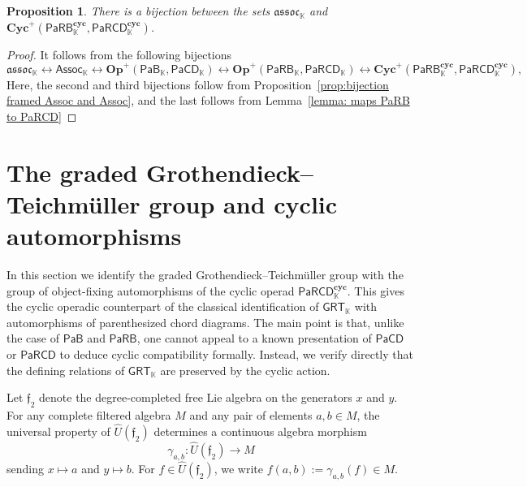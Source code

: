 \documentclass{amsart}
\newcommand{\kk}{\mathbb{K}}    %
\newcommand{\PaRB}{\mathsf{PaRB}}
\newcommand{\PaRCD}{\mathsf{PaRCD}}
\newcommand{\PaCD}{\mathsf{PaCD}}
\newcommand{\hPaB}{{\PaB}_{\kk}}
\newcommand{\hPaCD}{{\PaCD}_{\kk}}
\newcommand{\hPaRB}{{\PaRB}_{\kk}}
\newcommand{\hPaRCD}{{\PaRCD}_{\kk}}
\newcommand{\PaB}{\mathsf{PaB}}
\newcommand{\cyc}{\mathbf{cyc}}
\newcommand{\Cyc}{\mathbf{Cyc}}
\newcommand{\Op}{\mathbf{Op}}
\newcommand{\GRT}{{\mathsf{GRT}}}
\newcommand{\Assoc}{\mathsf{Assoc}}
\newcommand{\assoc}{\mathfrak{assoc}} %
\newcommand{\ff}{\mathfrak{f}}
\newtheorem{prop}[theorem]{Proposition}%
\theoremstyle{definition}
\numberwithin{equation}{section}
\begin{document}
\begin{prop}\label{prop: bijection of cyclic associators}
There is a bijection between the sets $\assoc_{\kk}$ and $\Cyc^{+}(\hPaRB^{\cyc}, \hPaRCD^{\cyc})$.
\end{prop}

\begin{proof}
It follows from the following bijections
\begin{equation}
\assoc_{\kk} \leftrightarrow \Assoc_{\kk} \leftrightarrow \Op^{+}(\hPaB, \hPaCD) \leftrightarrow \Op^{+}(\hPaRB, \hPaRCD) \leftrightarrow \Cyc^{+}(\hPaRB^{\cyc}, \hPaRCD^{\cyc}),
\end{equation}
Here, the second and third bijections follow from Proposition~\ref{prop:bijection framed Assoc and Assoc}, and the last follows from Lemma~\ref{lemma: maps PaRB to PaRCD}
\end{proof}



\section{The graded Grothendieck--Teichmüller group and cyclic automorphisms}\label{sec:GRT}

In this section we identify the graded Grothendieck--Teichmüller group with the group of object-fixing automorphisms of the cyclic operad $\hPaRCD^{\cyc}$. This gives the cyclic operadic counterpart of the classical identification of $\GRT_{\kk}$ with automorphisms of parenthesized chord diagrams. The main point is that, unlike the case of $\PaB$ and $\PaRB$, one cannot appeal to a known presentation of $\PaCD$ or $\PaRCD$ to deduce cyclic compatibility formally. Instead, we verify directly that the defining relations of $\GRT_{\kk}$ are preserved by the cyclic action. 


Let $\ff_2$ denote the degree-completed free Lie algebra on the generators $x$ and $y$. For any complete filtered algebra $M$ and any pair of elements $a,b \in M$, the universal property of $\hat U(\ff_2)$ determines a continuous algebra morphism
\[
\gamma_{a,b} \colon \hat U(\ff_2)\to M
\]
sending $x\mapsto a$ and $y\mapsto b$. For $f\in \hat U(\ff_2)$, we write $f(a,b):=\gamma_{a,b}(f)\in M.$
\end{document}
